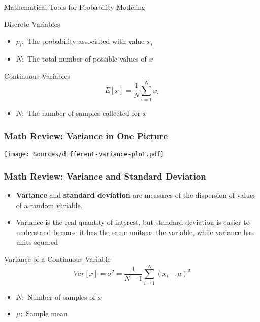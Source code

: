\documentclass[handout, 11pt]{beamer}
\begin{document}
\begin{section}{Mathematical Tools for Probability Modeling}
\begin{frame}
\begin{block}{Discrete Variables}
\begin{itemize}
A specific value for
$x$
\item $p_i:$
The probability associated with value
$x_i$
\item $N:$
The total number of possible values of
$x$
\end{itemize}
\end{block}
\begin{block}{Continuous Variables}
\begin{equation}
	E[x] = \frac{1}{N} \sum_{i=1}^{N} x_i
\end{equation}
\vspace{-0.4cm}
\begin{itemize}
\item $N:$
The number of samples collected for
$x$
\end{itemize}
\end{block}
\end{frame}
\begin{frame}
\frametitle{Math Review: Variance in One Picture}
\begin{center}
\begin{adjustbox}{width=0.9\textwidth, height=0.8\textheight, keepaspectratio}
\texttt{[image: Sources/different-variance-plot.pdf]}
\end{adjustbox}
\end{center}
\end{frame}
\begin{frame}
\frametitle{Math Review: Variance and Standard Deviation}
\footnotesize
\begin{itemize}
\item \textbf{Variance}
and
\textbf{standard deviation}
are measures of the dispersion of values of a random variable.
\item Variance is the real quantity of interest, but standard deviation is easier to understand because it has the same units as the variable, while variance has units squared
\end{itemize}
\begin{block}{Variance of a Continuous Variable}
\begin{equation}
	Var[x] = \sigma^2 = \frac{1}{N - 1} \sum_{i=1}^{N} (x_i - \mu)^2
\end{equation}
\vspace{-0.3cm}
\begin{itemize}
\item $N:$
Number of samples of
$x$
\item $\mu:$
Sample mean
\end{itemize}

\end{block}
\end{frame}
\end{section}
\end{document}
